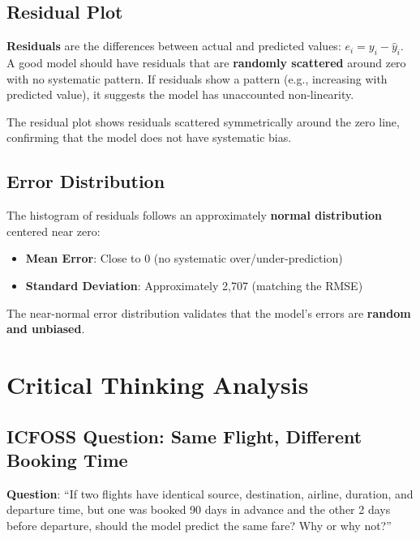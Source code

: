 \documentclass[12pt, a4paper]{article}
\newcommand{\rupee}{\text{₹}}
\begin{document}
\subsection{Residual Plot}

\begin{keyterm}
\textbf{Residuals} are the differences between actual and predicted values: $e_i = y_i - \hat{y}_i$. A good model should have residuals that are \textbf{randomly scattered} around zero with no systematic pattern. If residuals show a pattern (e.g., increasing with predicted value), it suggests the model has unaccounted non-linearity.
\end{keyterm}

The residual plot shows residuals scattered symmetrically around the zero line, confirming that the model does not have systematic bias.

\subsection{Error Distribution}

The histogram of residuals follows an approximately \textbf{normal distribution} centered near zero:
\begin{itemize}[leftmargin=*]
    \item \textbf{Mean Error}: Close to \rupee0 (no systematic over/under-prediction)
    \item \textbf{Standard Deviation}: Approximately \rupee2,707 (matching the RMSE)
\end{itemize}

The near-normal error distribution validates that the model's errors are \textbf{random and unbiased}.

\newpage

\section{Critical Thinking Analysis}

\subsection{ICFOSS Question: Same Flight, Different Booking Time}

\begin{importantbox}
\textbf{Question}: ``If two flights have identical source, destination, airline, duration, and departure time, but one was booked 90 days in advance and the other 2 days before departure, should the model predict the same fare? Why or why not?''
\end{importantbox}
\end{document}
